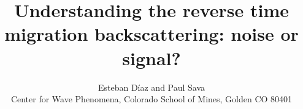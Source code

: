

\setlength{\parskip}{2.5pt}
\setlength{\textfloatsep}{7pt}
\setlength{\abovecaptionskip}{2.5pt}

\renewcommand\floatpagefraction{.9}
\renewcommand\topfraction{.9}
\renewcommand\bottomfraction{.9}
\renewcommand\textfraction{.1}
\setcounter{totalnumber}{50}
\setcounter{topnumber}{50}
\setcounter{bottomnumber}{50}

\author{Esteban D\'{i}az and Paul Sava\\ 
Center for Wave Phenomena,  
Colorado School of Mines, Golden CO 80401}

\title{Understanding the reverse time migration backscattering: noise or signal?}

\maketitle









